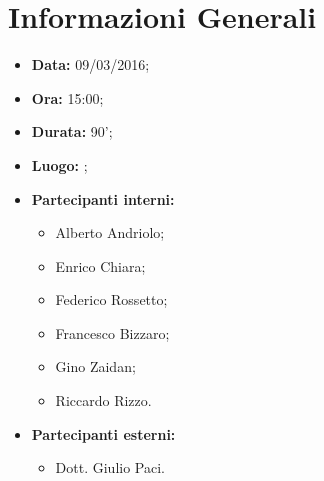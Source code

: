 \section{Informazioni Generali}

\begin{itemize}
\item \textbf{Data:} 09/03/2016;
\item \textbf{Ora:} 15:00;
\item \textbf{Durata:} 90';
\item \textbf{Luogo:} \AZIENDA;
\item \textbf{Partecipanti interni:} \GRUPPO
	\begin{itemize}
	\item Alberto Andriolo;
	\item Enrico Chiara;
	\item Federico Rossetto;
	\item Francesco Bizzaro;
	\item Gino Zaidan;
	\item Riccardo Rizzo.
	\end{itemize}
\item \textbf{Partecipanti esterni:} \AZIENDA
	\begin{itemize}
	\item Dott. Giulio Paci.
	\end{itemize}
\end{itemize}

\newpage










